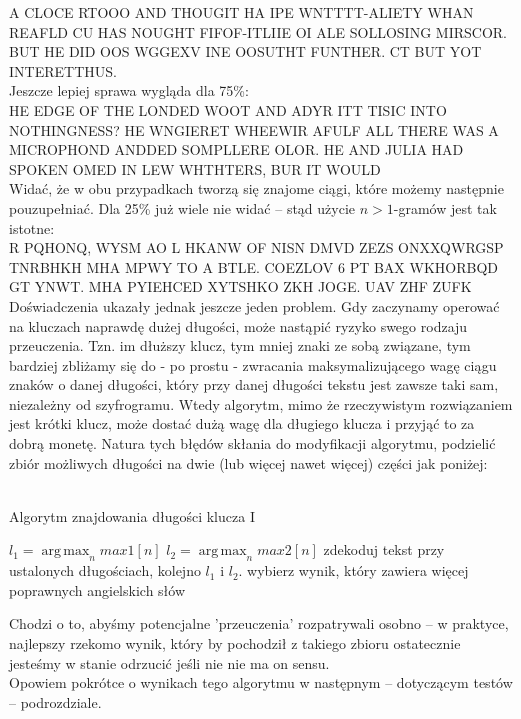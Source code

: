 \documentclass[a4paper]{article}
\DeclareMathOperator*{\argmax}{arg\,max}
\begin{document}
A CLOCE RTOOO AND THOUGIT HA IPE WNTTTT-ALIETY WHAN REAFLD CU HAS NOUGHT FIFOF-ITLIIE OI ALE SOLLOSING MIRSCOR. BUT HE DID OOS WGGEXV INE OOSUTHT FUNTHER. CT BUT YOT INTERETTHUS.
\\
Jeszcze lepiej sprawa wygląda dla 75\%:\\
HE EDGE OF THE LONDED WOOT AND ADYR ITT TISIC INTO NOTHINGNESS? HE WNGIERET WHEEWIR AFULF ALL THERE WAS A MICROPHOND ANDDED SOMPLLERE OLOR. HE AND JULIA HAD SPOKEN OMED IN LEW WHTHTERS, BUR IT WOULD
\\
Widać, że w obu przypadkach tworzą się znajome ciągi, które możemy następnie pouzupełniać. Dla 25\% już wiele nie widać – stąd użycie $n>1$-gramów jest tak istotne:\\
R PQHONQ, WYSM AO L HKANW OF NISN DMVD ZEZS ONXXQWRGSP TNRBHKH MHA MPWY TO A BTLE. COEZLOV 6 PT BAX WKHORBQD GT YNWT. MHA PYIEHCED XYTSHKO ZKH JOGE. UAV ZHF ZUFK\\
Doświadczenia ukazały jednak jeszcze jeden problem. Gdy zaczynamy operować na kluczach naprawdę dużej długości, może nastąpić ryzyko swego rodzaju przeuczenia. Tzn. im dłuższy klucz, tym mniej znaki ze sobą związane, tym bardziej zbliżamy się do - po prostu - zwracania maksymalizującego wagę ciągu znaków o danej długości, który przy danej długości tekstu jest zawsze taki sam, niezależny od szyfrogramu. Wtedy algorytm, mimo że rzeczywistym rozwiązaniem jest krótki klucz, może dostać dużą wagę dla długiego klucza i przyjąć to za dobrą monetę. Natura tych błędów skłania do modyfikacji algorytmu, podzielić zbiór możliwych długości na dwie (lub więcej nawet więcej) części jak poniżej:\\\\
\begin{algorithm}[H]
\caption{Algorytm znajdowania długości klucza I}
$l_1 = \argmax_n max1[n]$\;
$l_2 = \argmax_n max2[n]$\;
zdekoduj tekst przy ustalonych długościach, kolejno $l_1$ i $l_2$. wybierz wynik, który zawiera więcej poprawnych angielskich słów\;
\end{algorithm}
Chodzi o to, abyśmy potencjalne 'przeuczenia' rozpatrywali osobno – w praktyce, najlepszy rzekomo wynik, który by pochodził z takiego zbioru ostatecznie jesteśmy w stanie odrzucić jeśli nie nie ma on sensu. \\
Opowiem pokrótce o wynikach tego algorytmu w następnym – dotyczącym testów – podrozdziale.
\end{document}
